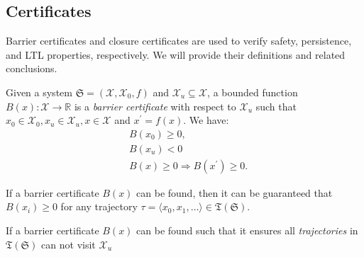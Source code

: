 
\subsection{Certificates}
Barrier certificates and closure certificates are used to verify safety\cite{prajna2004safety}, persistence\cite{murali2024closure}, and LTL properties\cite{murali2024closure}, respectively. We will provide their definitions and related conclusions.

\begin{definition}
  \label{SCDEF}
  Given a system $\mathfrak{S} = (\mathcal{X}, \mathcal{X}_0, f)$ and $\mathcal{X}_{u} \subseteq \mathcal{X}$, a bounded function $B(x): \mathcal{X} \rightarrow \mathbb{R}$ is a \emph{barrier certificate} with respect to $\mathcal{X}_{u}$ such that $x_0 \in \mathcal{X}_0, x_u \in \mathcal{X}_u, x \in \mathcal{X}$ and $x^{\prime} = f(x)$. We have:
  \begin{align}
    &B(x_0) \geq 0, \label{bsinn0} \\ %
    &B(x_u) < 0 \label{bsun0} \\ %
    &B(x) \geq 0 \Rightarrow B(x^{\prime}) \geq 0. \label{bstnn0} %
  \end{align}
\end{definition}
\begin{theorem}
  If a barrier certificate \( B(x) \) can be found, then it can be guaranteed that $B(x_i) \geq 0$ for any trajectory $\tau=\langle x_0, x_1, \dots \rangle \in \mathfrak{T}(\mathfrak{S})$.
\end{theorem}
\begin{corollary}[safety]
  \label{corollary_tbsc}
  If a barrier certificate \( B(x) \) can be found such that it ensures all \emph{trajectories} in $\mathfrak{T}(\mathfrak{S})$ can not visit $\mathcal{X}_{u}$
\end{corollary}

